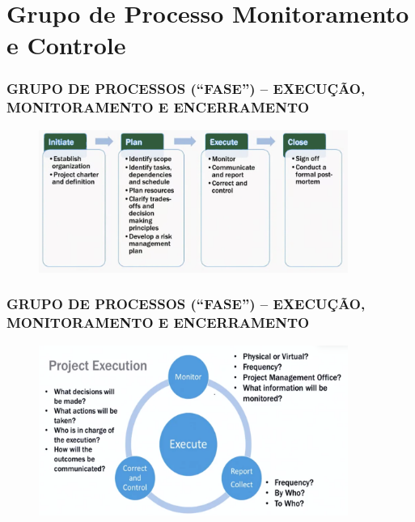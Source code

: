 \section{Grupo de Processo Monitoramento e Controle}

\begin{frame}
 \frametitle{GRUPO DE PROCESSOS (“FASE”) – \small{EXECUÇÃO, MONITORAMENTO E ENCERRAMENTO}}
  \begin{figure}
   \centering
   \includegraphics[width = 0.9\textwidth]{figs/fig0.png}
  \end{figure}
\end{frame}

\begin{frame}
 \frametitle{GRUPO DE PROCESSOS (“FASE”) – \small{EXECUÇÃO, MONITORAMENTO E ENCERRAMENTO}}
  \begin{figure}
   \centering
   \includegraphics[width = 0.9\textwidth]{figs/fig11.png}
  \end{figure}
\end{frame}


